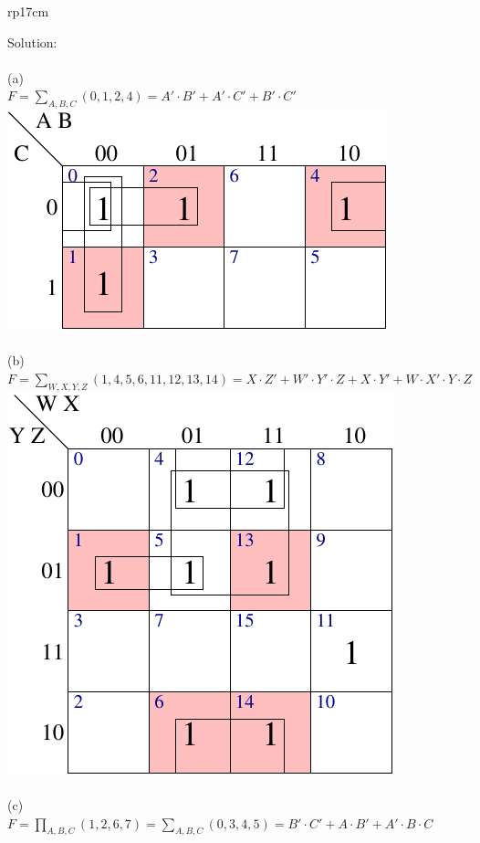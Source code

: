 \documentclass{article}
\begin{document}
\begin{longtable}[l]{rp{17cm}}
\begin{minipage}[t]{\linewidth}
Solution: \\ \\
(a)\\
$F=\sum_{A,B,C}(0,1,2,4)=A' \cdot B' + A' \cdot C' + B' \cdot C'$\\
\includegraphics{../CombinationalCircuits/Assessments/wakerly_4_15_a}\\ \\
(b)\\
$F=\sum_{W,X,Y,Z}(1,4,5,6,11,12,13,14)=X \cdot Z' + W' \cdot Y' \cdot Z + X \cdot Y'+ W \cdot X' \cdot Y \cdot Z$\\
\includegraphics{../CombinationalCircuits/Assessments/wakerly_4_15_b}\\ \\
(c)\\
$F=\prod_{A,B,C}(1,2,6,7)=\sum_{A,B,C}(0,3,4,5)=B' \cdot C' + A \cdot B' + A' \cdot B \cdot C$\\

\end{minipage}
\end{longtable}
\end{document}
